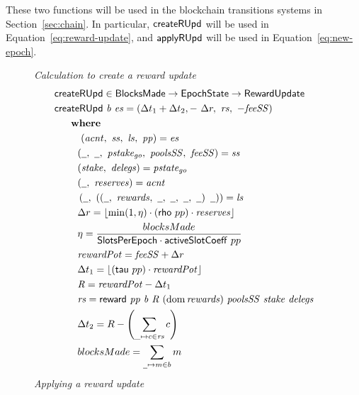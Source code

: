 These two functions will be used in the blockchain transitions systems in Section~\ref{sec:chain}.
In particular,
$\mathsf{createRUpd}$ will be used in Equation~\ref{eq:reward-update},
and $\mathsf{applyRUpd}$ will be used in Equation~\ref{eq:new-epoch}.

\begin{figure}[htb]
  \emph{Calculation to create a reward update}
  \begin{align*}
      & \fun{createRUpd} \in \BlocksMade \to \EpochState \to \RewardUpdate \\
      & \createRUpd{b}{es} = \left(
        \Delta t_1+\Delta t_2,-~\Delta r,~\var{rs},~-\var{feeSS} \right) \\
      & ~~~\where \\
      &~~~~~~~~(\var{acnt},~\var{ss},~\var{ls},~\var{pp}) = \var{es} \\
      & ~~~~~~~(\wcard,~\wcard,~\var{pstake_{go}},~\var{poolsSS},~\var{feeSS}) = \var{ss}\\
      & ~~~~~~~(\var{stake},~\var{delegs}) = \var{pstate_{go}} \\
      & ~~~~~~~(\wcard,~\var{reserves}) = \var{acnt} \\
      & ~~~~~~~\left(
                 \wcard,~
                 \left(
                   \left(\wcard,~\var{rewards},~\wcard,~\wcard,~\wcard,~\wcard\right)~
                   \wcard
                 \right)
               \right) = \var{ls} \\
      & ~~~~~~~\Delta r = \floor*{\min(1,\eta) \cdot (\fun{rho}~{pp}) \cdot \var{reserves}}
    \\
      & ~~~~~~~\eta = \frac{blocksMade}{\SlotsPerEpoch \cdot \fun{activeSlotCoeff}~{pp}} \\
      & ~~~~~~~\var{rewardPot} = \var{feeSS} + \Delta r \\
      & ~~~~~~~\Delta t_1 = \floor*{(\fun{tau}~{pp}) \cdot \var{rewardPot}} \\
      & ~~~~~~~\var{R} = \var{rewardPot} - \Delta t_1 \\
      & ~~~~~~~\var{rs}
           = \reward{pp}{b}{R}{(\dom{rewards})}{poolsSS}{stake}{delegs} \\
      & ~~~~~~~\Delta t_{2} = R - \left(\sum\limits_{\_\mapsto c\in\var{rs}}c\right) \\
      & ~~~~~~~blocksMade = \sum_{\wcard \mapsto m \in b}m
  \end{align*}
  \emph{Applying a reward update}
  \begin{align*}

\end{align*}
\end{figure}
